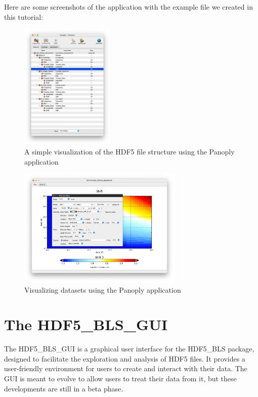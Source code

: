 \documentclass{article}
\begin{document}
Here are some screenshots of the application with the example file we created in this tutorial: 

\begin{figure}[H]
    \centering
    \includegraphics[width=0.4\textwidth]{img/Panoply_developed_structure.png}
    \caption{A simple visualization of the HDF5 file structure using the Panoply application} 
    \label{fig:panoply_developed_structure}
\end{figure}

\begin{figure}[H]
    \centering
    \includegraphics[width=0.7\textwidth]{img/Panoply_viewer.png}
    \caption{Visualizing datasets using the Panoply application} 
    \label{fig:panoply_viewer}
\end{figure}

\section{The HDF5\_BLS\_GUI}

The HDF5\_BLS\_GUI is a graphical user interface for the HDF5\_BLS package, designed to facilitate the exploration and analysis of HDF5 files. It provides a user-friendly environment for users to create and interact with their data. The GUI is meant to evolve to allow users to treat their data from it, but these developments are still in a beta phase. 
\end{document}
